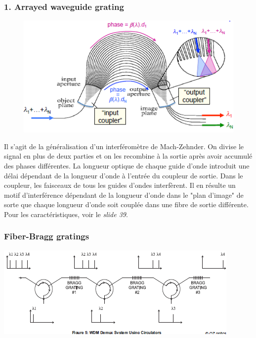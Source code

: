 \subsubsection{1. Arrayed waveguide grating}
	\begin{figure}
	\vspace{-5mm}
	\includegraphics[scale=0.65]{ch3/image25}
	\end{figure}
Il s'agit de la généralisation d'un interféromètre de Mach-Zehnder. On divise le signal en plus
de deux parties et on les recombine à la sortie après avoir accumulé des phases différentes. La 
longueur optique de chaque guide d'onde introduit une délai dépendant de la longueur d'onde à 
l'entrée du coupleur de sortie. Dans le coupleur, les faisceaux de tous les guides d'ondes interfèrent. Il en résulte un motif d'interférence dépendant de la longueur d'onde dans le "plan d'image" de sorte que chaque longueur d'onde soit couplée dans une fibre de sortie différente.
Pour les caractéristiques, voir le \textit{slide 39}.

\subsubsection{Fiber-Bragg gratings}
\begin{center}
	\includegraphics[scale=0.65]{ch3/image26}
\end{center}
\newpage
